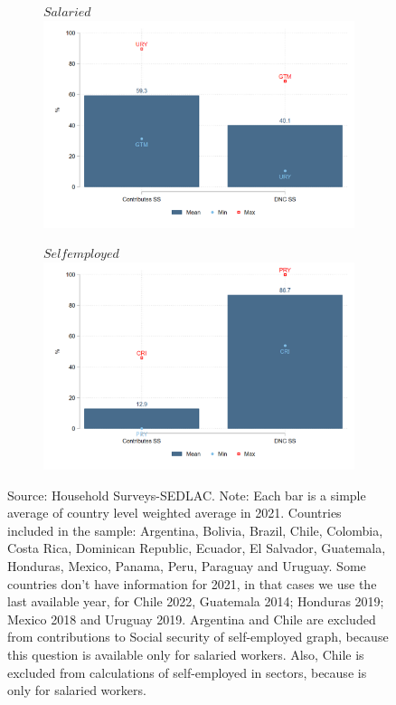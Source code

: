\documentclass[english]{article}
\begin{document}
\begin{itemize}
\begin{figure}[htb!]
\begin{subfigure}{.5\textwidth}
  \centering
    \footnotesize{$Salaried$}
  \includegraphics[width=1\textwidth]{latex/figures/Snapshot/Salaried-SS.png}
  \label{fig:salariedSS}
\end{subfigure}%
\begin{subfigure}{.5\textwidth}
  \centering
\footnotesize{$Self employed$}
\includegraphics[width=1\textwidth]{latex/figures/Snapshot/Self employed-SS.png}
  \label{fig:selfSS}
\end{subfigure}
\justifying
\footnotesize{Source: Household Surveys-SEDLAC.}
\footnotesize{Note: Each bar is a simple average of country level weighted average in 2021. Countries included in the sample: Argentina, Bolivia, Brazil, Chile, Colombia, Costa Rica, Dominican Republic, Ecuador, El Salvador, Guatemala, Honduras, Mexico, Panama, Peru, Paraguay and Uruguay. Some countries don’t have information for 2021, in that cases we use the last available year, for Chile 2022, Guatemala 2014; Honduras 2019; Mexico 2018 and Uruguay 2019. Argentina and Chile are excluded from contributions to Social security of self-employed graph, because this question is available only for salaried workers. Also, Chile is excluded from calculations of self-employed in sectors, because is only for salaried workers.}


\end{figure}
\end{itemize}
\end{document}
